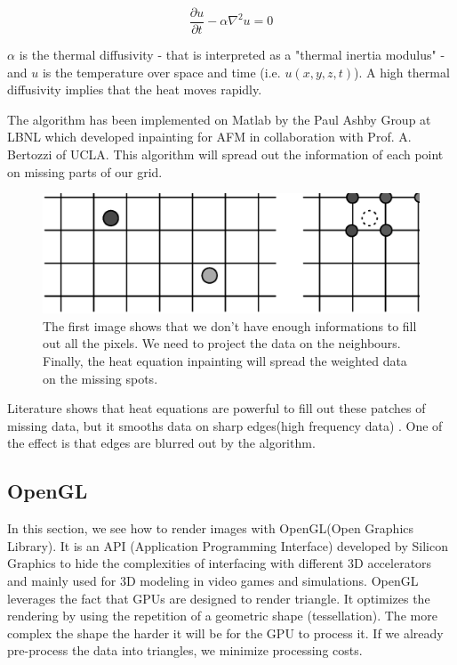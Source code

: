 \begin{equation}\label{eqn:heateq}
\frac{\partial u}{\partial t} - \alpha \nabla^2 u = 0
\end{equation}

$\alpha$ is the thermal diffusivity - that is interpreted as a "thermal inertia modulus" - and $u$ is the temperature over space and time (i.e. $u(x,y,z,t)$). A high thermal diffusivity implies that the heat moves rapidly.

The algorithm has been implemented on Matlab by the Paul Ashby Group at LBNL which developed inpainting for AFM in collaboration with Prof. A. Bertozzi of UCLA. This algorithm will spread out the information of each point on missing parts of our grid.

\begin{figure}[!ht]
  \centering
  \includegraphics[scale=0.3]{images/inpainting3step.eps}
    \caption{The first image shows that we don't have enough informations to fill out all the pixels. We need to project the data on the neighbours. Finally, the heat equation inpainting will spread the weighted data on the missing spots.}
  \label{inpainting3step}
\end{figure}

Literature shows that heat equations are powerful to fill out these patches of missing data, but it smooths data on sharp edges(high frequency data)\cite{aubert2006mathematical} . One of the effect is that edges are blurred out by the algorithm.


\subsection{OpenGL}

In this section, we see how to render images with OpenGL(Open Graphics Library). It is an API (Application Programming Interface) developed by Silicon Graphics to hide the complexities of interfacing with different 3D accelerators and mainly used for 3D modeling in video games and simulations. OpenGL leverages the fact that GPUs are designed to render triangle. It optimizes the rendering by using the repetition of a geometric shape (tessellation). The more complex the shape the harder it will be for the GPU to process it. If we already pre-process the data into triangles, we minimize processing costs. \cite{abobegpu}

